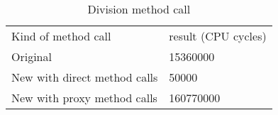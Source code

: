 \begin{table}[!htbp]
\centering
\caption{Division method call}
\label{tab:table2}
\begin{tabular}{ll}
\hline\noalign{\smallskip}
Kind of method call & result (CPU cycles)\\
\noalign{\smallskip}
\hline
\noalign{\smallskip}
Original & 15360000\\
New with direct method calls & 50000\\
New with proxy method calls & 160770000\\
\hline
\end{tabular}

\end{table}


